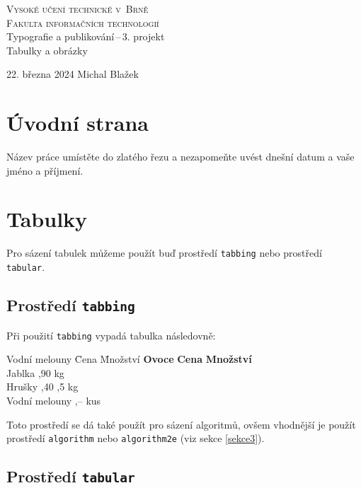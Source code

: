 \documentclass[a4paper, 11pt]{article}
\begin{document}
\begin{titlepage}
\begin{center}
    \Huge
    \textsc{Vysoké učení technické v~Brně\\
    \huge{Fakulta informačních technologií}}\\
    \LARGE{Typografie a publikování\,--\,3. projekt}\\
    \Huge{Tabulky a obrázky}\\
\end{center}
{\Large 22. března 2024 \hfill Michal Blažek}
\end{titlepage}

\section{Úvodní strana}

Název práce umístěte do zlatého řezu a nezapomeňte uvést dnešní datum a vaše jméno a příjmení.

\section{Tabulky}

Pro sázení tabulek můžeme použít buď prostředí \texttt{tabbing} nebo prostředí \texttt{tabular}.

\subsection{Prostředí \texttt{tabbing}}

Při použití \texttt{tabbing} vypadá tabulka následovně:

\begin{tabbing}
    Vodní melouny \quad \= Cena \quad \= Množství \kill
    \textbf{Ovoce} \> \textbf{Cena} \> \textbf{Množství} \\
    Jablka ,90  kg \\
    Hrušky ,40 ,5 kg \\
    Vodní melouny ,--  kus \\
\end{tabbing}
Toto prostředí se dá také použít pro sázení algoritmů, ovšem vhodnější je použít prostředí \texttt{algorithm} nebo \texttt{algorithm2e} (viz sekce \ref{sekce3}).

\subsection{Prostředí \texttt{tabular}}
\end{document}
